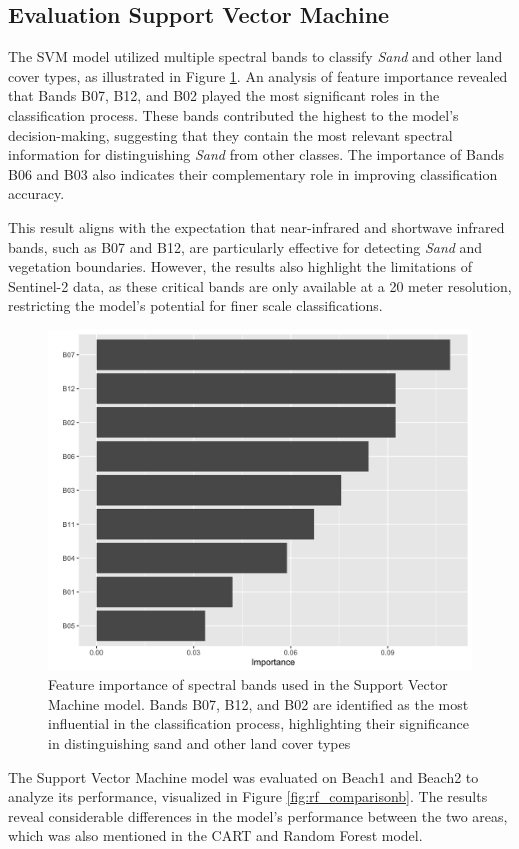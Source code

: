 \documentclass[a4paper,12pt]{article}
\begin{document}
\subsection{Evaluation Support Vector Machine}
The SVM model utilized multiple spectral bands to classify \textit{Sand} and other land cover types, as illustrated in Figure \ref{fig:svm importance}. An analysis of feature importance revealed that Bands B07, B12, and B02 played the most significant roles in the classification process. These bands contributed the highest to the model's decision-making, suggesting that they contain the most relevant spectral information for distinguishing \textit{Sand} from other classes. The importance of Bands B06 and B03 also indicates their complementary role in improving classification accuracy.

This result aligns with the expectation that near-infrared and shortwave infrared bands, such as B07 and B12, are particularly effective for detecting \textit{Sand} and vegetation boundaries. However, the results also highlight the limitations of Sentinel-2 data, as these critical bands are only available at a 20 meter resolution, restricting the model's potential for finer scale classifications.

\begin{figure} [H]
    \centering
    \includegraphics[width=0.65\linewidth]{Support Vector Machine/importance SVM.png}
    \caption[Feature importance of spectral bands used in the Support Vector Machine model]{Feature importance of spectral bands used in the Support Vector Machine model. Bands B07, B12, and B02 are identified as the most influential in the classification process, highlighting their significance in distinguishing sand and other land cover types}
    \label{fig:svm importance}
\end{figure}

The Support Vector Machine model was evaluated on Beach1 and Beach2 to analyze its performance, visualized in Figure \ref{fig:rf_comparisonb}. The results reveal considerable differences in the model's performance between the two areas, which was also mentioned in the CART and Random Forest model.
\end{document}
